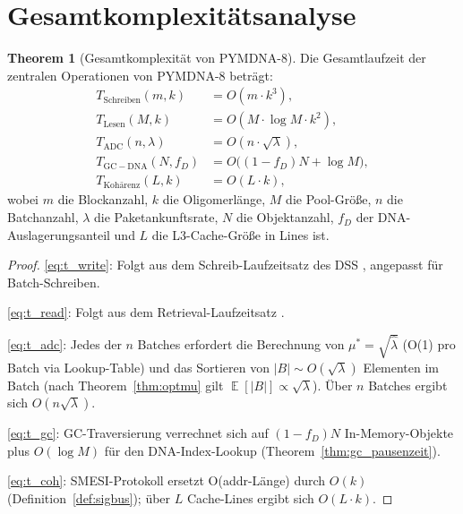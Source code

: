 ﻿\documentclass[a4paper,12pt]{article}
\theoremstyle{definition}
\newtheorem{theorem}{Theorem}[section]
\DeclareMathOperator{\E}{\mathbb{E}}
\begin{document}
\section{Gesamtkomplexitätsanalyse}

\begin{theorem}[Gesamtkomplexität von PYMDNA-8]
  \label{thm:gesamtkomplexitaet}
  Die Gesamtlaufzeit der zentralen Operationen von PYMDNA-8 beträgt:
  \begin{align}
    T_{\mathrm{Schreiben}}(m, k) &= O(m \cdot k^3), \label{eq:t_write} \\
    T_{\mathrm{Lesen}}(M, k)     &= O(M \cdot \log M \cdot k^2), \label{eq:t_read} \\
    T_{\mathrm{ADC}}(n, \lambda) &= O(n \cdot \sqrt{\lambda}), \label{eq:t_adc} \\
    T_{\mathrm{GC-DNA}}(N, f_D)  &= O\bigl((1-f_D) N + \log M\bigr), \label{eq:t_gc} \\
    T_{\mathrm{Kohärenz}}(L, k)  &= O(L \cdot k), \label{eq:t_coh}
  \end{align}
  wobei $m$ die Blockanzahl, $k$ die Oligomerlänge, $M$ die Pool-Größe,
  $n$ die Batchanzahl, $\lambda$ die Paketankunftsrate, $N$ die Objektanzahl,
  $f_D$ der DNA-Auslagerungsanteil und $L$ die L3-Cache-Größe in Lines ist.
\end{theorem}

\begin{proof}
  \eqref{eq:t_write}: Folgt aus dem Schreib-Laufzeitsatz des DSS
  \cite[Satz~5.2]{epp2026dnastor}, angepasst für Batch-Schreiben.

  \eqref{eq:t_read}: Folgt aus dem Retrieval-Laufzeitsatz \cite[Satz~6.4]{epp2026dnastor}.

  \eqref{eq:t_adc}: Jedes der $n$ Batches erfordert die Berechnung von
  $\mu^* = \sqrt{\hat\lambda}$ (O(1) pro Batch via Lookup-Table)
  und das Sortieren von $|B| \sim O(\sqrt{\lambda})$ Elementen im
  Batch (nach Theorem~\ref{thm:optmu} gilt $\E[|B|] \propto \sqrt{\lambda}$).
  Über $n$ Batches ergibt sich $O(n \sqrt{\lambda})$.

  \eqref{eq:t_gc}: GC-Traversierung verrechnet sich auf
  $(1-f_D) N$ In-Memory-Objekte plus $O(\log M)$ für den DNA-Index-Lookup
  (Theorem~\ref{thm:gc_pausenzeit}).

  \eqref{eq:t_coh}: SMESI-Protokoll ersetzt O(addr-Länge) durch $O(k)$
  (Definition~\ref{def:sigbus}); über $L$ Cache-Lines ergibt sich $O(L \cdot k)$.
\end{proof}
\end{document}
